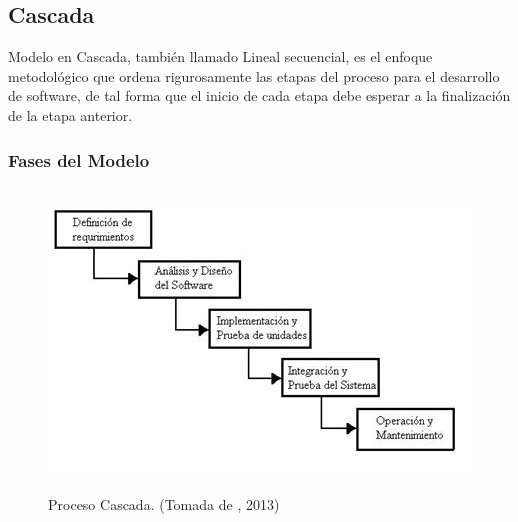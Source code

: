
\pagebreak
\subsection{Cascada}

Modelo en Cascada, también llamado Lineal secuencial, es el enfoque metodológico que ordena rigurosamente las etapas del proceso para el desarrollo de software, de tal forma que el inicio de cada etapa debe esperar a la finalización de la etapa anterior. 

\subsubsection{Fases del Modelo}

\begin{figure}[H]
\begin{center}
	\includegraphics[width=13cm,height=8cm]{img/cascada.jpg}
\end{center}
\caption{Proceso Cascada. (Tomada de \citet{cascadabib}, 2013)}
\label{fig:Casacada}
\end{figure}

